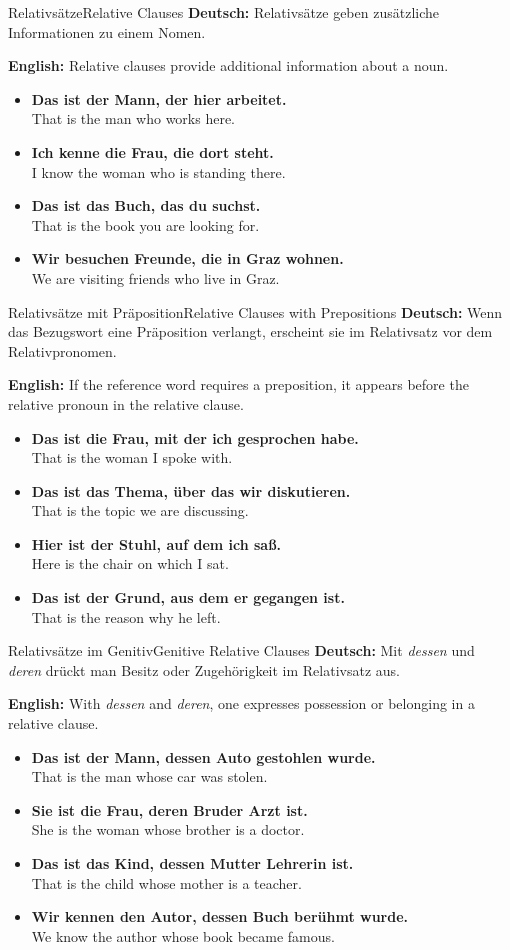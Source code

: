 \documentclass[a4paper,11pt]{article}
\newcommand{\GermanText}[1]{\textbf{Deutsch: }#1\par}
\newcommand{\EnglishText}[1]{{\color{SoftGray}\textbf{English: }#1\par}}
\newcommand{\ExampleItem}[2]{\item \textbf{#1}\\{\color{SoftGray}#2}}
\begin{document}
\begin{grammarentry}{Relativsätze}{Relative Clauses}
    \GermanText{Relativsätze geben zusätzliche Informationen zu einem Nomen.}
    \EnglishText{Relative clauses provide additional information about a noun.}
    \begin{exbox}
        \begin{itemize}
            \ExampleItem{Das ist der Mann, der hier arbeitet.}{That is the man who works here.}
            \ExampleItem{Ich kenne die Frau, die dort steht.}{I know the woman who is standing there.}
            \ExampleItem{Das ist das Buch, das du suchst.}{That is the book you are looking for.}
            \ExampleItem{Wir besuchen Freunde, die in Graz wohnen.}{We are visiting friends who live in Graz.}
        \end{itemize}
    \end{exbox}
\end{grammarentry}

\begin{grammarentry}{Relativsätze mit Präposition}{Relative Clauses with Prepositions}
    \GermanText{Wenn das Bezugswort eine Präposition verlangt, erscheint sie im Relativsatz vor dem Relativpronomen.}
    \EnglishText{If the reference word requires a preposition, it appears before the relative pronoun in the relative clause.}
    \begin{exbox}
        \begin{itemize}
            \ExampleItem{Das ist die Frau, mit der ich gesprochen habe.}{That is the woman I spoke with.}
            \ExampleItem{Das ist das Thema, über das wir diskutieren.}{That is the topic we are discussing.}
            \ExampleItem{Hier ist der Stuhl, auf dem ich saß.}{Here is the chair on which I sat.}
            \ExampleItem{Das ist der Grund, aus dem er gegangen ist.}{That is the reason why he left.}
        \end{itemize}
    \end{exbox}
\end{grammarentry}

\begin{grammarentry}{Relativsätze im Genitiv}{Genitive Relative Clauses}
    \GermanText{Mit \textit{dessen} und \textit{deren} drückt man Besitz oder Zugehörigkeit im Relativsatz aus.}
    \EnglishText{With \textit{dessen} and \textit{deren}, one expresses possession or belonging in a relative clause.}
    \begin{exbox}
        \begin{itemize}
            \ExampleItem{Das ist der Mann, dessen Auto gestohlen wurde.}{That is the man whose car was stolen.}
            \ExampleItem{Sie ist die Frau, deren Bruder Arzt ist.}{She is the woman whose brother is a doctor.}
            \ExampleItem{Das ist das Kind, dessen Mutter Lehrerin ist.}{That is the child whose mother is a teacher.}
            \ExampleItem{Wir kennen den Autor, dessen Buch berühmt wurde.}{We know the author whose book became famous.}
        \end{itemize}
    \end{exbox}
\end{grammarentry}
\end{document}
